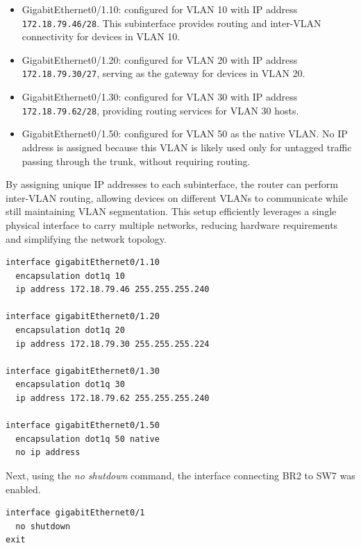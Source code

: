\begin{itemize}
    \item GigabitEthernet0/1.10: configured for VLAN 10 with IP address \texttt{172.18.79.46/28}. This subinterface provides routing and inter-VLAN connectivity for devices in VLAN 10.
    \item GigabitEthernet0/1.20: configured for VLAN 20 with IP address \texttt{172.18.79.30/27}, serving as the gateway for devices in VLAN 20.
    \item GigabitEthernet0/1.30: configured for VLAN 30 with IP address \texttt{172.18.79.62/28}, providing routing services for VLAN 30 hosts.
    \item GigabitEthernet0/1.50: configured for VLAN 50 as the native VLAN. No IP address is assigned because this VLAN is likely used only for untagged traffic passing through the trunk, without requiring routing.
\end{itemize}

By assigning unique IP addresses to each subinterface, the router can perform inter-VLAN routing, allowing devices on different VLANs to communicate while still maintaining VLAN segmentation. This setup efficiently leverages a single physical interface to carry multiple networks, reducing hardware requirements and simplifying the network topology.

\begin{lstlisting}[caption={Subinterfaces configuration on BR2 router}, label={lst:subintf-BR2}]
interface gigabitEthernet0/1.10
  encapsulation dot1q 10
  ip address 172.18.79.46 255.255.255.240

interface gigabitEthernet0/1.20
  encapsulation dot1q 20
  ip address 172.18.79.30 255.255.255.224

interface gigabitEthernet0/1.30
  encapsulation dot1q 30
  ip address 172.18.79.62 255.255.255.240

interface gigabitEthernet0/1.50
  encapsulation dot1q 50 native
  no ip address
\end{lstlisting}


Next, using the \textit{no shutdown} command, the interface connecting BR2 to SW7 was enabled.

\begin{lstlisting}[caption={Turn on Interface GigabitEthernet0/1 between SW7 and BR2}, label={lst:sw7-BR2}]
interface gigabitEthernet0/1
  no shutdown
exit
\end{lstlisting}

\vspace{0.1cm}
